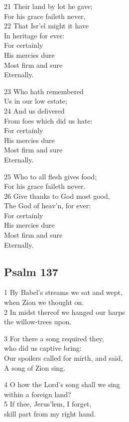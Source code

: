 21 Their land by lot he gave;\\
For his grace faileth never,\\
22 That Isr’el might it have\\
In heritage for ever:\\
For certainly\\
His mercies dure\\
Most firm and sure\\
Eternally.

23 Who hath remembered\\
Us in our low estate;\\
24 And us delivered\\
From foes which did us hate:\\
For certainly\\
His mercies dure\\
Most firm and sure\\
Eternally.

25 Who to all flesh gives food;\\
For his grace faileth never.\\
26 Give thanks to God most good,\\
The God of heav’n, for ever:\\
For certainly\\
His mercies dure\\
Most firm and sure\\
Eternally.

\begin{center}
\quad{}\quad{}
\end{center}

\subsection*{Psalm 137}

1 By Babel’s streams we sat and wept,\\
when Zion we thought on.\\
2 In midst thereof we hanged our harps\\
the willow-trees upon.

3 For there a song required they,\\
who did us captive bring:\\
Our spoilers called for mirth, and said,\\
A song of Zion sing.

4 O how the Lord’s song shall we sing\\
within a foreign land?\\
5 If thee, Jerus’lem, I forget,\\
skill part from my right hand.

